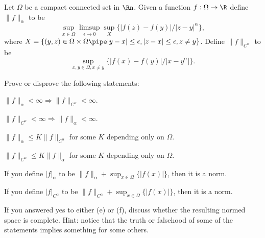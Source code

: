 Let $\Omega$ be a compact connected set in $\Rn$. Given a function
$f:\Omega\rightarrow \R$ define $\|f\|_{\alpha}$ to be 
$$\sup_{x\in
\Omega}\limsup_{\epsilon\rightarrow
0}\sup_{X}\{|f(z)-f(y)|/|z-y|^{\alpha}\},$$ where $X=\{(y,z)\in
\Omega\times \Omega\pipe |y-x|\leq \epsilon, |z-x|\leq \epsilon, z\neq y\}$.
Define $\|f\|_{C^{\alpha}}$ to be $$\sup_{x,y\in \Omega, x\neq
y}\{|f(x)-f(y)|/|x-y^{\alpha}|\}.$$

Prove or disprove the following statements:
\begin{alist}
\item $\|f\|_{\alpha}<\infty\Rightarrow \|f\|_{C^{\alpha}}<\infty$.
\item $\|f\|_{C^{\alpha}}<\infty\Rightarrow \|f\|_{\alpha}<\infty$.
\item $\|f\|_{\alpha}\leq K\|f\|_{C^{\alpha}}$ for some $K$ depending
only on $\Omega$.
\item $\|f\|_{C^{\alpha}}\leq K\|f\|_{\alpha}$ for some $K$ depending
only on $\Omega$.
\item If you define $|f|_{\alpha}$ to be $\|f\|_{\alpha}+\sup_{x\in
\Omega}\{|f(x)|\}$, then it is a norm.
\item If you define $|f|_{C^{\alpha}}$ to be
$\|f\|_{C^{\alpha}}+\sup_{x\in \Omega}\{|f(x)|\}$, then it is a norm.
\end{alist}

If you answered yes to either (e) or (f), discuss whether the
resulting normed space is complete. Hint: notice that the truth or
falsehood of some of the statements implies something for some others.
